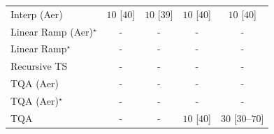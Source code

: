 \begin{tabular}{l|cccc|}
Interp (Aer) & {\cellcolor[HTML]{F7FCF5}} \color[HTML]{000000} $10$ [$40$] & {\cellcolor[HTML]{F7FCF5}} \color[HTML]{000000} $10$ [$39$] & {\cellcolor[HTML]{F7FCF5}} \color[HTML]{000000} $10$ [$40$] & {\cellcolor[HTML]{F7FCF5}} \color[HTML]{000000} $10$ [$40$] \\
Linear Ramp (Aer)$^\star$ & {\cellcolor[HTML]{000000}} \color[HTML]{F1F1F1} {\cellcolor{white}} \color{black} - & {\cellcolor[HTML]{000000}} \color[HTML]{F1F1F1} {\cellcolor{white}} \color{black} - & {\cellcolor[HTML]{000000}} \color[HTML]{F1F1F1} {\cellcolor{white}} \color{black} - & {\cellcolor[HTML]{000000}} \color[HTML]{F1F1F1} {\cellcolor{white}} \color{black} - \\
Linear Ramp$^\star$ & {\cellcolor[HTML]{000000}} \color[HTML]{F1F1F1} {\cellcolor{white}} \color{black} - & {\cellcolor[HTML]{000000}} \color[HTML]{F1F1F1} {\cellcolor{white}} \color{black} - & {\cellcolor[HTML]{000000}} \color[HTML]{F1F1F1} {\cellcolor{white}} \color{black} - & {\cellcolor[HTML]{000000}} \color[HTML]{F1F1F1} {\cellcolor{white}} \color{black} - \\
Recursive TS & {\cellcolor[HTML]{000000}} \color[HTML]{F1F1F1} {\cellcolor{white}} \color{black} - & {\cellcolor[HTML]{000000}} \color[HTML]{F1F1F1} {\cellcolor{white}} \color{black} - & {\cellcolor[HTML]{000000}} \color[HTML]{F1F1F1} {\cellcolor{white}} \color{black} - & {\cellcolor[HTML]{000000}} \color[HTML]{F1F1F1} {\cellcolor{white}} \color{black} - \\
TQA (Aer) & {\cellcolor[HTML]{000000}} \color[HTML]{F1F1F1} {\cellcolor{white}} \color{black} - & {\cellcolor[HTML]{000000}} \color[HTML]{F1F1F1} {\cellcolor{white}} \color{black} - & {\cellcolor[HTML]{000000}} \color[HTML]{F1F1F1} {\cellcolor{white}} \color{black} - & {\cellcolor[HTML]{000000}} \color[HTML]{F1F1F1} {\cellcolor{white}} \color{black} - \\
TQA (Aer)$^\star$ & {\cellcolor[HTML]{000000}} \color[HTML]{F1F1F1} {\cellcolor{white}} \color{black} - & {\cellcolor[HTML]{000000}} \color[HTML]{F1F1F1} {\cellcolor{white}} \color{black} - & {\cellcolor[HTML]{000000}} \color[HTML]{F1F1F1} {\cellcolor{white}} \color{black} - & {\cellcolor[HTML]{000000}} \color[HTML]{F1F1F1} {\cellcolor{white}} \color{black} - \\
TQA & {\cellcolor[HTML]{000000}} \color[HTML]{F1F1F1} {\cellcolor{white}} \color{black} - & {\cellcolor[HTML]{000000}} \color[HTML]{F1F1F1} {\cellcolor{white}} \color{black} - & {\cellcolor[HTML]{F7FCF5}} \color[HTML]{000000} $10$ [$40$] & {\cellcolor[HTML]{F4FBF1}} \color[HTML]{000000} $30$ [$30$--$70$] \\

\end{tabular}
